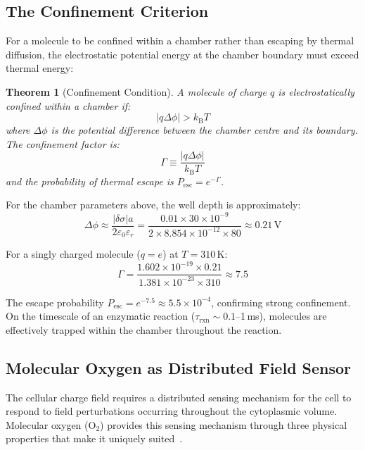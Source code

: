 \documentclass[11pt,twocolumn,a4paper]{article}
\newtheorem{theorem}{Theorem}[section]
\theoremstyle{definition}
\theoremstyle{remark}
\newcommand{\kB}{k_{\mathrm{B}}}
\newcommand{\eps}{\varepsilon}
\newcommand{\epsz}{\varepsilon_{0}}
\newcommand{\abs}[1]{\left|#1\right|}
\begin{document}
\subsection{The Confinement Criterion}

For a molecule to be confined within a chamber rather than escaping by thermal diffusion, the electrostatic potential energy at the chamber boundary must exceed thermal energy:

\begin{theorem}[Confinement Condition]
\label{thm:confinement}
A molecule of charge $q$ is electrostatically confined within a chamber if:
\begin{equation}
  \abs{q \Delta\phi} > \kB T
  \label{eq:confinement}
\end{equation}
where $\Delta\phi$ is the potential difference between the chamber centre and its boundary. The confinement factor is:
\begin{equation}
  \Gamma \equiv \frac{\abs{q \Delta\phi}}{\kB T}
\end{equation}
and the probability of thermal escape is $P_{\mathrm{esc}} = e^{-\Gamma}$.
\end{theorem}

For the chamber parameters above, the well depth is approximately:
\begin{equation}
  \Delta\phi \approx \frac{\abs{\delta\sigma} a}{2 \epsz \eps_r} = \frac{0.01 \times 30 \times 10^{-9}}{2 \times 8.854 \times 10^{-12} \times 80} \approx 0.21\,\mathrm{V}
\end{equation}

For a singly charged molecule ($q = e$) at $T = 310$\,K:
\begin{equation}
  \Gamma = \frac{1.602 \times 10^{-19} \times 0.21}{1.381 \times 10^{-23} \times 310} \approx 7.5
\end{equation}

The escape probability $P_{\mathrm{esc}} = e^{-7.5} \approx 5.5 \times 10^{-4}$, confirming strong confinement. On the timescale of an enzymatic reaction ($\tau_{\mathrm{rxn}} \sim 0.1$--1\,ms), molecules are effectively trapped within the chamber throughout the reaction.

\subsection{Molecular Oxygen as Distributed Field Sensor}

The cellular charge field requires a distributed sensing mechanism for the cell to respond to field perturbations occurring throughout the cytoplasmic volume. Molecular oxygen ($\mathrm{O}_2$) provides this sensing mechanism through three physical properties that make it uniquely suited~\cite{Pauling1931,Ochiai2008}.
\end{document}
